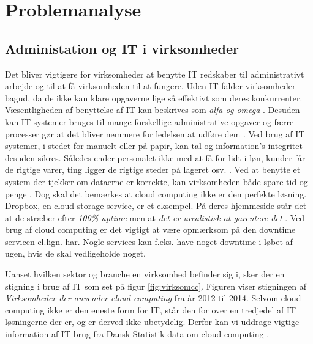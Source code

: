 \chapter{Problemanalyse}\label{ch:analyse}
\section{Administation og IT i virksomheder}

Det bliver vigtigere for virksomheder at benytte IT redskaber til administrativt arbejde og til at få virksomheden til at fungere. Uden IT falder virksomheder bagud, da de ikke kan klare opgaverne lige så effektivt som deres konkurrenter. Væsentligheden af benyttelse af IT kan beskrives som \textit{alfa og omega} \citep{case_green_team}. Desuden kan IT systemer bruges til mange forskellige administrative opgaver og færre processer gør at det bliver nemmere for ledelsen at udføre dem \citep{Ibiz_streamline}. Ved brug af IT systemer, i stedet for manuelt eller på papir, kan tal og information's integritet desuden sikres. Således ender personalet ikke med at få for lidt i løn, kunder får de rigtige varer, ting ligger de rigtige steder på lageret osv. \citep{Ibiz_streamline}. Ved at benytte et system der tjekker om dataerne er korrekte, kan virksomheden både spare tid og penge \citep{case_green_team}. Dog skal det bemærkes at cloud computing ikke er den perfekte løsning. Dropbox, en cloud storage service, er et eksempel. På deres hjemmeside står det at de stræber efter \textit{100\% uptime} men at \textit{det er urealistisk at garentere det} \citep{drpbx_downtime}. Ved brug af cloud computing er det vigtigt at være opmærksom på den downtime servicen el.lign. har. Nogle services kan f.eks. have noget downtime i løbet af ugen, hvis de skal vedligeholde noget.

Uanset hvilken sektor og branche en virksomhed befinder sig i, sker der en stigning i brug af IT som set på figur \ref{fig:virksomcc}. Figuren viser stigningen af \textit{Virksomheder der anvender cloud computing} fra år 2012 til 2014. Selvom cloud computing ikke er den eneste form for IT, står den for over en tredjedel af IT løsningerne der er, og er derved ikke ubetydelig. Derfor kan vi uddrage vigtige information af IT-brug fra Dansk Statistik data om cloud computing \citep{itvirk}.

